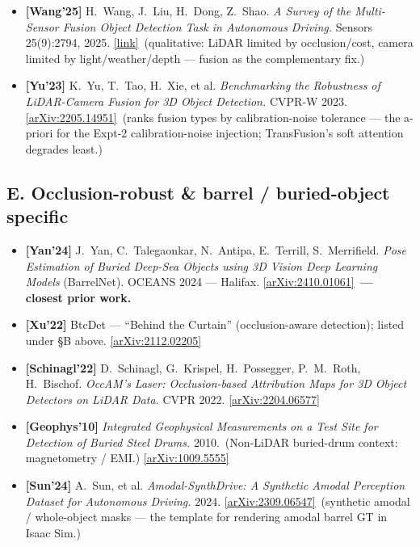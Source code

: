 \documentclass[10pt,a4paper]{article}
\begin{document}
{\begin{itemize}[leftmargin=1.4em,itemsep=3pt,topsep=2pt]
{  BEVFusion for 3D Object Detection.} arXiv, Nov 2025.
  \href{https://arxiv.org/abs/2511.04347}{[arXiv:2511.04347]} \,(nuScenes; controlled
  camera/LiDAR occlusion injection --- quantitative motivation in \S4.)
  \item \textbf{[Wang'25]} H.~Wang, J.~Liu, H.~Dong, Z.~Shao. \emph{A Survey of the
  Multi-Sensor Fusion Object Detection Task in Autonomous Driving.} Sensors 25(9):2794,
  2025. \href{https://www.mdpi.com/1424-8220/25/9/2794}{[link]} \,(qualitative: LiDAR
  limited by occlusion/cost, camera limited by light/weather/depth --- fusion as the
  complementary fix.)
  \item \textbf{[Yu'23]} K.~Yu, T.~Tao, H.~Xie, et al. \emph{Benchmarking the Robustness of
  LiDAR-Camera Fusion for 3D Object Detection.} CVPR-W 2023.
  \href{https://arxiv.org/abs/2205.14951}{[arXiv:2205.14951]} \,(ranks fusion types by
  calibration-noise tolerance --- the a-priori for the Expt-2 calibration-noise injection;
  TransFusion's soft attention degrades least.)
\end{itemize}

\subsection*{E. Occlusion-robust \& barrel / buried-object specific}
\begin{itemize}[leftmargin=1.4em,itemsep=3pt,topsep=2pt]
  \item \textbf{[Yan'24]} J.~Yan, C.~Talegaonkar, N.~Antipa, E.~Terrill, S.~Merrifield.
  \emph{Pose Estimation of Buried Deep-Sea Objects using 3D Vision Deep Learning Models}
  (BarrelNet). OCEANS 2024 --- Halifax. \href{https://arxiv.org/abs/2410.01061}{[arXiv:2410.01061]}
  \,\textbf{--- closest prior work.}
  \item \textbf{[Xu'22]} BtcDet --- ``Behind the Curtain'' (occlusion-aware detection);
  listed under \S B above. \href{https://arxiv.org/abs/2112.02205}{[arXiv:2112.02205]}
  \item \textbf{[Schinagl'22]} D.~Schinagl, G.~Krispel, H.~Possegger, P.~M.~Roth,
  H.~Bischof. \emph{OccAM's Laser: Occlusion-based Attribution Maps for 3D Object
  Detectors on LiDAR Data.} CVPR 2022. \href{https://arxiv.org/abs/2204.06577}{[arXiv:2204.06577]}
  \item \textbf{[Geophys'10]} \emph{Integrated Geophysical Measurements on a Test Site for
  Detection of Buried Steel Drums.} 2010. \,(Non-LiDAR buried-drum context: magnetometry /
  EMI.) \href{https://arxiv.org/abs/1009.5555}{[arXiv:1009.5555]}
  \item \textbf{[Sun'24]} A.~Sun, et al. \emph{Amodal-SynthDrive: A Synthetic Amodal
  Perception Dataset for Autonomous Driving.} 2024.
  \href{https://arxiv.org/abs/2309.06547}{[arXiv:2309.06547]} \,(synthetic amodal / whole-object
  masks --- the template for rendering amodal barrel GT in Isaac Sim.)
\end{itemize}

}
\end{document}
